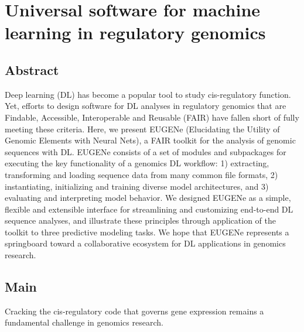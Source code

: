 \chapter{Universal software for machine learning in regulatory genomics}
\label{chap:chapter 1}

\section{Abstract}

Deep learning (DL) has become a popular tool to study cis-regulatory function. Yet, efforts to design software for DL analyses in regulatory genomics that are Findable, Accessible, Interoperable and Reusable (FAIR) have fallen short of fully meeting these criteria. Here, we present EUGENe (Elucidating the Utility of Genomic Elements with Neural Nets), a FAIR toolkit for the analysis of genomic sequences with DL. EUGENe consists of a set of modules and subpackages for executing the key functionality of a genomics DL workflow: 1) extracting, transforming and loading sequence data from many common file formats, 2) instantiating, initializing and training diverse model architectures, and 3) evaluating and interpreting model behavior. We designed EUGENe as a simple, flexible and extensible interface for streamlining and customizing end-to-end DL sequence analyses, and illustrate these principles through application of the toolkit to three predictive modeling tasks. We hope that EUGENe represents a springboard toward a collaborative ecosystem for DL applications in genomics research.

\section{Main}

Cracking the cis-regulatory code that governs gene expression remains a fundamental challenge in genomics research.

